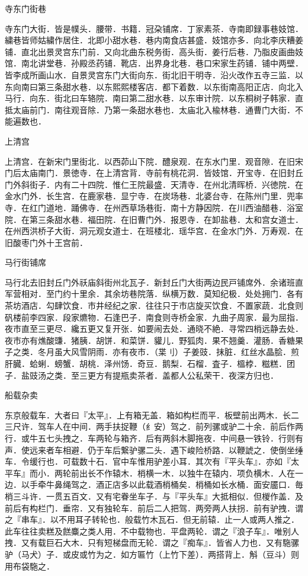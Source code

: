 \documentclass[]{article}
\begin{document}
寺东门街巷

寺东门大街．皆是幞头．腰带．书籍．冠朶铺席．丁家素茶．寺南即録事巷妓馆．繍巷皆师姑繍作居住．北即小甜水巷．巷内南食店甚盛．妓馆亦多．向北李庆糟姜铺．直北出景灵宫东门前．又向北曲东税务街．高头街．姜行后巷．乃脂皮画曲妓馆．南北讲堂巷．孙殿丞药铺．靴店．出界身北巷．巷口宋家生药铺．铺中两壁．皆李成所画山水．自景灵宫东门大街向东．街北旧干明寺．沿火改作五寺三监．以东向南曰第三条甜水巷．以东熙熙楼客店．都下着数．以东街南高阳正店．向北入马行．向东．街北曰车辂院．南曰第二甜水巷．以东审计院．以东桐树子韩家．直抵太庙前门．南往观音除．乃第一条甜水巷也．太庙北入楡林巷．通曹门大街．不能遍数也．

上清宫

上清宫．在新宋门里街北．以西茆山下院．醴泉观．在东水门里．观音隙．在旧宋门后太庙南门．景徳寺．在上清宫背．寺前有桃花洞．皆妓馆．开宝寺．在旧封丘门外斜街子．内有二十四院．惟仁王院最盛．天清寺．在州北清晖桥．兴徳院．在金水门外．长生宫．在鹿家巷．显宁寺．在炭场巷．北婆台寺．在陈州门里．兜率寺．在红门道地．踊佛寺．在州西草场巷街．南十方静因院．在川西油醋巷．浴室院．在第三条甜水巷．福田院．在旧曹门外．报恩寺．在卸盐巷．太和宫女道士．在州西洪桥子大街．洞元观女道士．在班楼北．瑶华宫．在金水门外．万寿观．在旧酸枣门外十王宫前．

马行街铺席

马行北去旧封丘门外祅庙斜街州北瓦子．新封丘门大街两边民戸铺席外．余诸班直军营相对．至门约十里余．其余坊巷院落．纵横万数．莫知纪极．处处拥门．各有茶坊酒店．勾肆饮食．市井经纪之家．往往只于市店旋买饮食．不置家蔬．北食则矾楼前李四家．段家爊物．石逢巴子．南食则寺桥金家．九曲子周家．最为屈指．夜市直至三更尽．纔五更又复开张．如要闹去处．通晓不絶．寻常四梢远静去处．夜市亦有燋酸豏．猪胰．胡饼．和菜饼．貛儿．野狐肉．果不翘羹．灌肠．香糖果子之类．冬月虽大风雪阴雨．亦有夜市．（枼刂）子姜豉．抹脏．红丝水晶脍．煎肝臓．蛤蜊．螃蟹．胡桃．泽州饧．奇豆．鹅梨．石榴．査子．榲桲．糍糕．团子．盐豉汤之类．至三更方有提瓶卖茶者．盖都人公私荣干．夜深方归也．

船载杂卖

东京般载车．大者曰『太平』．上有箱无盖．箱如构栏而平．板壁前出两木．长二三尺许．驾车人在中间．两手扶捉鞭（纟安）驾之．前列骡或驴二十余．前后作两行．或牛五七头拽之．车两轮与箱齐．后有两斜木脚拖夜．中间悬一铁铃．行则有声．使远来者车相避．仍于车后繋驴骡二头．遇下峻险桥路．以鞭諕之．使倒坐缍车．令缓行也．可载数十石．官中车惟用驴差小耳．其次有『平头车』．亦如『太平车』而小．两轮前出长不作辕木．梢横一木．以独牛在辕内．项负横木．人在一边．以手牵牛鼻绳驾之．酒正店多以此载酒梢桶矣．梢桶如长水桶．面安靥口．毎梢三斗许．一贯五百文．又有宅眷坐车子．与『平头车』大抵相似．但椶作盖．及前后有构栏门．垂帘．又有独轮车．前后二人把驾．两旁两人扶拐．前有驴拽．谓之『串车』．以不用耳子转轮也．般载竹木瓦石．但无前辕．止一人或两人推之．此车往往卖糕及餻麋之类人用．不中载物也．平盘两轮．谓之『浪子车』．唯别人拽．又有载巨石大木．只有短梯盘而无轮．谓之『痴车』．皆省人力也．又有駞骡驴（马犬）子．或皮或竹为之．如方匾竹（上竹下差）．两搭背上．斛（豆斗）则用布袋駞之．
\end{document}
